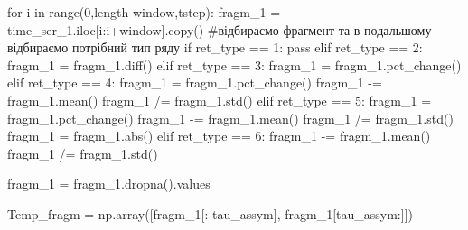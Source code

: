 \documentclass[
  letterpaper,
]{report}
\newenvironment{Shaded}{\begin{snugshade}}{\end{snugshade}}
\newcommand{\BuiltInTok}[1]{\textcolor[rgb]{0.00,0.23,0.31}{#1}}
\newcommand{\CommentTok}[1]{\textcolor[rgb]{0.37,0.37,0.37}{#1}}
\newcommand{\ControlFlowTok}[1]{\textcolor[rgb]{0.00,0.23,0.31}{#1}}
\newcommand{\DecValTok}[1]{\textcolor[rgb]{0.68,0.00,0.00}{#1}}
\newcommand{\KeywordTok}[1]{\textcolor[rgb]{0.00,0.23,0.31}{#1}}
\newcommand{\NormalTok}[1]{\textcolor[rgb]{0.00,0.23,0.31}{#1}}
\newcommand{\OperatorTok}[1]{\textcolor[rgb]{0.37,0.37,0.37}{#1}}
\begin{document}
\begin{Shaded}
\begin{Highlighting}[]
\ControlFlowTok{for}\NormalTok{ i }\KeywordTok{in} \BuiltInTok{range}\NormalTok{(}\DecValTok{0}\NormalTok{,length}\OperatorTok{{-}}\NormalTok{window,tstep):}
\NormalTok{    fragm\_1 }\OperatorTok{=}\NormalTok{ time\_ser\_1.iloc[i:i}\OperatorTok{+}\NormalTok{window].copy() }\CommentTok{\#відбираємо фрагмент та в подальшому відбираємо потрібний тип ряду}
    \ControlFlowTok{if}\NormalTok{ ret\_type }\OperatorTok{==} \DecValTok{1}\NormalTok{:}
        \ControlFlowTok{pass}
    \ControlFlowTok{elif}\NormalTok{ ret\_type }\OperatorTok{==} \DecValTok{2}\NormalTok{:}
\NormalTok{        fragm\_1 }\OperatorTok{=}\NormalTok{ fragm\_1.diff()}
    \ControlFlowTok{elif}\NormalTok{ ret\_type }\OperatorTok{==} \DecValTok{3}\NormalTok{:}
\NormalTok{        fragm\_1 }\OperatorTok{=}\NormalTok{ fragm\_1.pct\_change()}
    \ControlFlowTok{elif}\NormalTok{ ret\_type }\OperatorTok{==} \DecValTok{4}\NormalTok{:}
\NormalTok{        fragm\_1 }\OperatorTok{=}\NormalTok{ fragm\_1.pct\_change()}
\NormalTok{        fragm\_1 }\OperatorTok{{-}=}\NormalTok{ fragm\_1.mean()}
\NormalTok{        fragm\_1 }\OperatorTok{/=}\NormalTok{ fragm\_1.std()}
    \ControlFlowTok{elif}\NormalTok{ ret\_type }\OperatorTok{==} \DecValTok{5}\NormalTok{: }
\NormalTok{        fragm\_1 }\OperatorTok{=}\NormalTok{ fragm\_1.pct\_change()}
\NormalTok{        fragm\_1 }\OperatorTok{{-}=}\NormalTok{ fragm\_1.mean()}
\NormalTok{        fragm\_1 }\OperatorTok{/=}\NormalTok{ fragm\_1.std()}
\NormalTok{        fragm\_1 }\OperatorTok{=}\NormalTok{ fragm\_1.}\BuiltInTok{abs}\NormalTok{()}
    \ControlFlowTok{elif}\NormalTok{ ret\_type }\OperatorTok{==} \DecValTok{6}\NormalTok{:}
\NormalTok{        fragm\_1 }\OperatorTok{{-}=}\NormalTok{ fragm\_1.mean()}
\NormalTok{        fragm\_1 }\OperatorTok{/=}\NormalTok{ fragm\_1.std()}
        
\NormalTok{    fragm\_1 }\OperatorTok{=}\NormalTok{ fragm\_1.dropna().values }
    
\NormalTok{    Temp\_fragm }\OperatorTok{=}\NormalTok{ np.array([fragm\_1[:}\OperatorTok{{-}}\NormalTok{tau\_assym], fragm\_1[tau\_assym:]])}
    

\end{Highlighting}
\end{Shaded}
\end{document}

